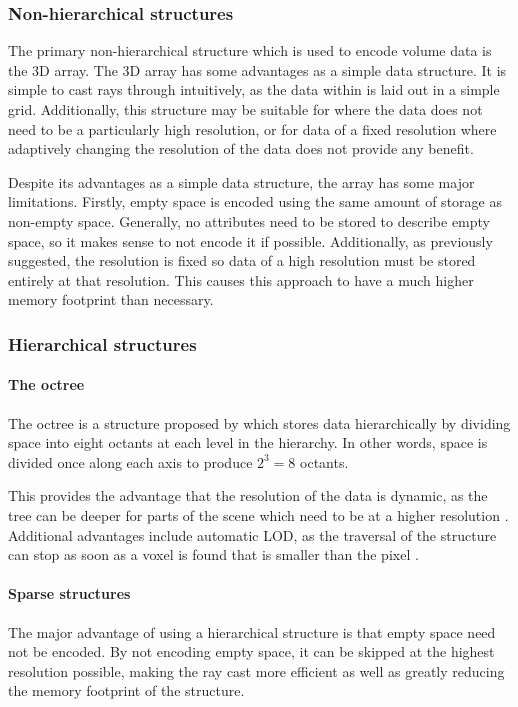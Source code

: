 \subsubsection{Non-hierarchical structures}
The primary non-hierarchical structure which is used to encode volume data is the 3D array. The 3D array has some advantages as a simple data structure. It is simple to cast rays through intuitively, as the data within is laid out in a simple grid. Additionally, this structure may be suitable for where the data does not need to be a particularly high resolution, or for data of a fixed resolution where adaptively changing the resolution of the data does not provide any benefit.

Despite its advantages as a simple data structure, the array has some major limitations. Firstly, empty space is encoded using the same amount of storage as non-empty space. Generally, no attributes need to be stored to describe empty space, so it makes sense to not encode it if possible. Additionally, as previously suggested, the resolution is fixed so data of a high resolution must be stored entirely at that resolution. This causes this approach to have a much higher memory footprint than necessary.

\subsubsection{Hierarchical structures}

\paragraph{The octree}
The octree is a structure proposed by \cite{meagher81octree} which stores data hierarchically by dividing space into eight octants at each level in the hierarchy. In other words, space is divided once along each axis to produce $2^3 = 8$ octants.

This provides the advantage that the resolution of the data is dynamic, as the tree can be deeper for parts of the scene which need to be at a higher resolution \parencite{laine10efficientsvos}. Additional advantages include automatic LOD, as the traversal of the structure can stop as soon as a voxel is found that is smaller than the pixel \parencite{laine10efficientsvos}.

\paragraph{Sparse structures}
The major advantage of using a hierarchical structure is that empty space need not be encoded. By not encoding empty space, it can be skipped at the highest resolution possible, making the ray cast more efficient as well as greatly reducing the memory footprint of the structure.

